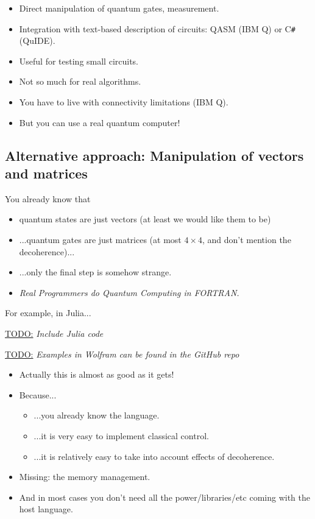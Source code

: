 \documentclass[a4paper,11pt]{article}
\newcommand{\todo}[1]{%
    \par\vspace{6pt}\noindent\underline{\textsc{TODO:}} \emph{#1}\vspace{6pt}%
}
\begin{document}
\begin{itemize}
\item Direct manipulation of quantum gates, measurement.
\item Integration with text-based description of circuits: QASM 
(IBM Q) or C\texttt{\#} (QuIDE).
\item Useful for testing small circuits.
\item Not so much for real algorithms.
\item You have to live with connectivity limitations (IBM Q).
\item But you can use a real quantum computer!
\end{itemize}


\subsection{Alternative approach: Manipulation of vectors and matrices}

You already know that
\begin{itemize}
    \item quantum states are just vectors (at least we would like them 
    to 
    be)
    \item ...quantum gates are just matrices (at most $4\times 4$, and 
    don't mention the decoherence)...
    \item ...only the final step is somehow strange.
    \item{\emph{Real Programmers do Quantum Computing in FORTRAN.}}
\end{itemize}


For example, in Julia... \\[12pt] 


\todo{Include Julia code}

\todo{Examples in Wolfram can be found in the GitHub repo}


\begin{itemize}
\item Actually this is almost as good as it gets!
\item Because...
\begin{itemize}
\item ...you already know the language.
\item ...it is very easy to implement 
classical control.
\item ...it is relatively easy to take into account effects of 
decoherence.
\end{itemize}
\item Missing: the memory management.
\item And in most cases you don't need all the power/libraries/etc 
coming with the host language.
\end{itemize}
\end{document}
